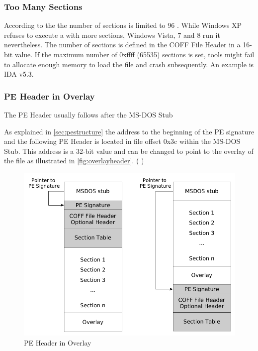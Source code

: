 \subsubsection*{Too Many Sections}

According to the \PECOFF{} the number of sections is limited to 96 \cite[]{pespec}. While Windows XP refuses to execute a \PE{} with more sections, Windows Vista, 7 and 8 run it nevertheless. The number of sections is defined in the COFF File Header in a 16-bit value. If the maximum number of 0xffff (65535) sections is set, tools might fail to allocate enough memory to load the file and crash subsequently. An example is IDA v5.3.

\subsubsection*{PE Header in Overlay}

The PE Header usually follows after the MS-DOS Stub 

As explained in \autoref{sec:pestructure} the address to the beginning of the PE signature and the following PE Header is located in file offset 0x3c within the MS-DOS Stub. This address is a 32-bit value and can be changed to point to the overlay of the file as illustrated in \autoref{fig:overlayheader}. (\cf{} \cite[slide 13]{vuksan11})

\begin{figure}
\includegraphics[width=.98\textwidth, height=.60\textheight,keepaspectratio]{graphics/overlayheader}
\caption{PE Header in Overlay }
\label{fig:overlayheader} 
\end{figure}

